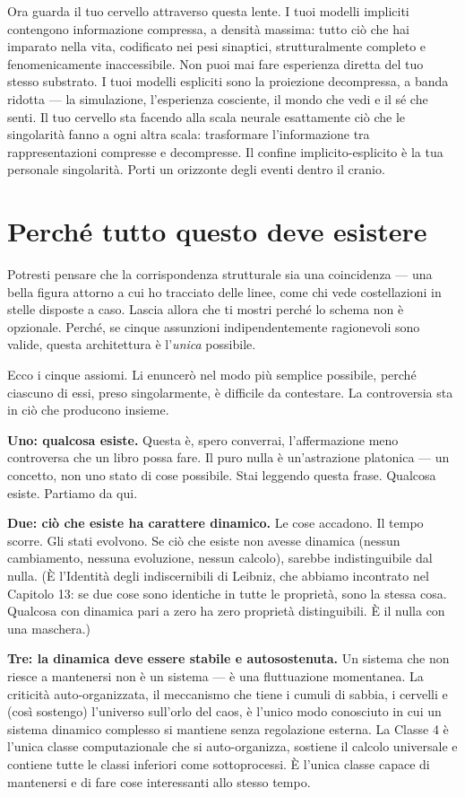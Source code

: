 \documentclass[11pt, twoside, openright]{book}
\begin{document}
Ora guarda il tuo cervello attraverso questa lente. I tuoi modelli impliciti contengono informazione compressa, a densità massima: tutto ciò che hai imparato nella vita, codificato nei pesi sinaptici, strutturalmente completo e fenomenicamente inaccessibile. Non puoi mai fare esperienza diretta del tuo stesso substrato. I tuoi modelli espliciti sono la proiezione decompressa, a banda ridotta --- la simulazione, l'esperienza cosciente, il mondo che vedi e il sé che senti. Il tuo cervello sta facendo alla scala neurale esattamente ciò che le singolarità fanno a ogni altra scala: trasformare l'informazione tra rappresentazioni compresse e decompresse. Il confine implicito-esplicito è la tua personale singolarità. Porti un orizzonte degli eventi dentro il cranio.

\section*{Perché tutto questo deve esistere}

Potresti pensare che la corrispondenza strutturale sia una coincidenza --- una bella figura attorno a cui ho tracciato delle linee, come chi vede costellazioni in stelle disposte a caso. Lascia allora che ti mostri perché lo schema non è opzionale. Perché, se cinque assunzioni indipendentemente ragionevoli sono valide, questa architettura è l'\textit{unica} possibile.

Ecco i cinque assiomi. Li enuncerò nel modo più semplice possibile, perché ciascuno di essi, preso singolarmente, è difficile da contestare. La controversia sta in ciò che producono insieme.

\textbf{Uno: qualcosa esiste.} Questa è, spero converrai, l'affermazione meno controversa che un libro possa fare. Il puro nulla è un'astrazione platonica --- un concetto, non uno stato di cose possibile. Stai leggendo questa frase. Qualcosa esiste. Partiamo da qui.

\textbf{Due: ciò che esiste ha carattere dinamico.} Le cose accadono. Il tempo scorre. Gli stati evolvono. Se ciò che esiste non avesse dinamica (nessun cambiamento, nessuna evoluzione, nessun calcolo), sarebbe indistinguibile dal nulla. (È l'Identità degli indiscernibili di Leibniz, che abbiamo incontrato nel Capitolo 13: se due cose sono identiche in tutte le proprietà, sono la stessa cosa. Qualcosa con dinamica pari a zero ha zero proprietà distinguibili. È il nulla con una maschera.)

\textbf{Tre: la dinamica deve essere stabile e autosostenuta.} Un sistema che non riesce a mantenersi non è un sistema --- è una fluttuazione momentanea. La criticità auto-organizzata, il meccanismo che tiene i cumuli di sabbia, i cervelli e (così sostengo) l'universo sull'orlo del caos, è l'unico modo conosciuto in cui un sistema dinamico complesso si mantiene senza regolazione esterna. La Classe 4 è l'unica classe computazionale che si auto-organizza, sostiene il calcolo universale e contiene tutte le classi inferiori come sottoprocessi. È l'unica classe capace di mantenersi e di fare cose interessanti allo stesso tempo.
\end{document}
